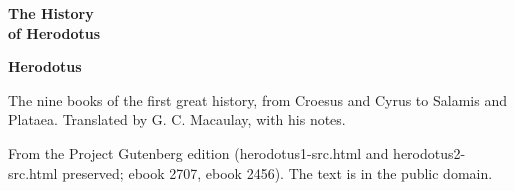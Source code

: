 \documentclass[11pt,letterpaper]{article}
\begin{document}
\color{ink}

\begin{titlepage}
\centering
\vspace*{4em}
{\LARGE\bfseries\color{heading} The History\\[0.3em]of Herodotus\par}
\vspace{2em}
{\Large\bfseries\color{heading} Herodotus\par}
\vspace{2.5em}
{\itshape\color{subhead}\parbox{0.8\linewidth}{\centering The nine books of the first great history, from Croesus and Cyrus to Salamis and Plataea. Translated by G. C. Macaulay, with his notes.\par}}
\vfill
{\small From the Project Gutenberg edition (herodotus1-src.html and herodotus2-src.html preserved; ebook 2707, ebook 2456). The text is in the public domain.\par}
\vspace{2em}
\end{titlepage}

\tableofcontents


\end{document}

